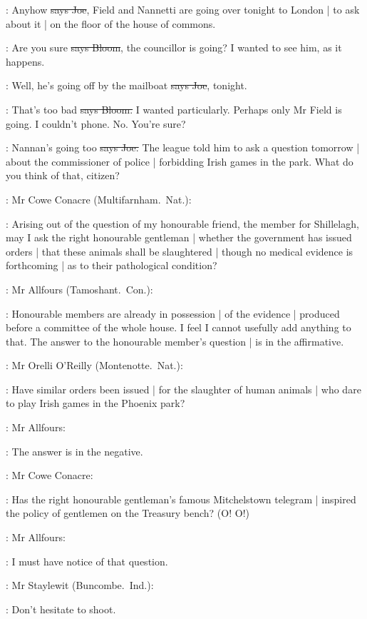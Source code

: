 \joe:
Anyhow
\sout{says Joe},
Field and Nannetti are going over tonight to London |
to ask about it |
on the floor of the house of commons.

\Bloom:
Are you sure
\sout{says Bloom},
the councillor is going?
I wanted to see him,
as it happens.

\joe:
Well,
he's going off by the mailboat
\sout{says Joe},
tonight.

\Bloom:
That's too bad
\sout{says Bloom.}
I wanted particularly.
Perhaps only Mr Field is going.
I couldn't phone.
No.
You're sure?

\joe:
Nannan's going too
\sout{says Joe.}
The league told him to ask a question tomorrow |
about the commissioner of police |
forbidding Irish games in the park.
What do you think of that,
citizen?

:
Mr Cowe Conacre
(Multifarnham.~Nat.):

\conacre:
Arising out of the question of my honourable friend,
the member for Shillelagh,
may I ask the right honourable gentleman |
whether the government has issued orders |
that these animals shall be slaughtered |
though no medical evidence is forthcoming |
as to their pathological condition?

:
Mr Allfours
(Tamoshant.~Con.):

\allfours:
Honourable members are already in possession |
of the evidence |
produced before a committee of the whole house.
I feel I cannot usefully add anything to that.
The answer to the honourable member's question |
is in the affirmative.

:
Mr Orelli O'Reilly
(Montenotte.~Nat.):


\oreilly:
Have similar orders been issued |
for the slaughter of human animals |
who dare to play Irish games in the Phoenix park?

:
Mr Allfours:

\allfours:
The answer is in the negative.

:
Mr Cowe Conacre:

\conacre:
Has the right honourable gentleman's famous Mitchelstown telegram |
inspired the policy of gentlemen on the Treasury bench?
(O!
O!)

:
Mr Allfours:

\allfours:
I must have notice of that question.

:
Mr Staylewit
(Buncombe.~Ind.):

\staylewit:
Don't hesitate to shoot.

